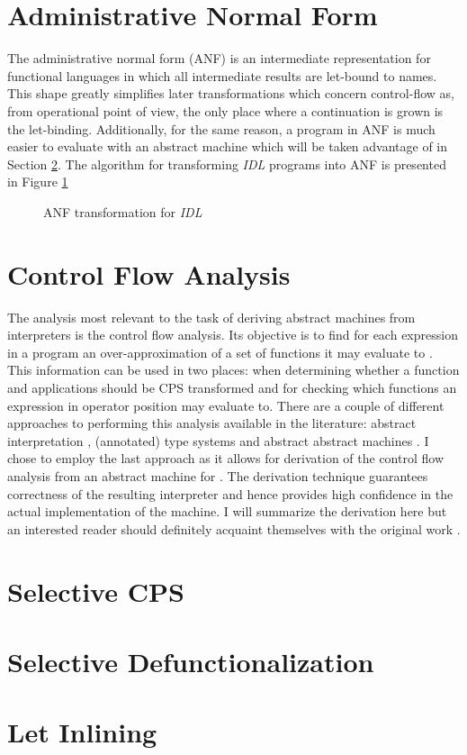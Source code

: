 \section{Administrative Normal Form}
The administrative normal form (ANF) \cite{flanagan-anf} is an intermediate representation for functional languages in which all intermediate results are let-bound to names.
This shape greatly simplifies later transformations which concern control-flow as, from operational point of view, the only place where a continuation is grown is the let-binding.
Additionally, for the same reason, a program in ANF is much easier to evaluate with an abstract machine which will be taken advantage of in Section \ref{sec:transformer-cfa}.
The algorithm for transforming \emph{IDL} programs into ANF is presented in Figure \ref{fig:transformer-anf}
\begin{figure}
  \caption{ANF transformation for \textit{IDL}}
  \label{fig:transformer-anf}
\end{figure}


\section{Control Flow Analysis}\label{sec:transformer-cfa}
The analysis most relevant to the task of deriving abstract machines from interpreters is the control flow analysis.
Its objective is to find for each expression in a program an over-approximation of a set of functions it may evaluate to \cite{popa}.
This information can be used in two places: when determining whether a function and applications should be CPS transformed and for checking which functions an expression in operator position may evaluate to.
There are a couple of different approaches to performing this analysis available in the literature: abstract interpretation \cite{popa}, (annotated) type systems \cite{popa} and abstract abstract machines \cite{aam}.
I chose to employ the last approach as it allows for derivation of the control flow analysis from an abstract machine for \IDL{}.
The derivation technique guarantees correctness of the resulting interpreter and hence provides high confidence in the actual implementation of the machine.
I will summarize the derivation here but an interested reader should definitely acquaint themselves with the original work \cite{aam}.



\section{Selective CPS}\label{sec:selective-cps}

\section{Selective Defunctionalization}\label{sec:selective-defun}

\section{Let Inlining}